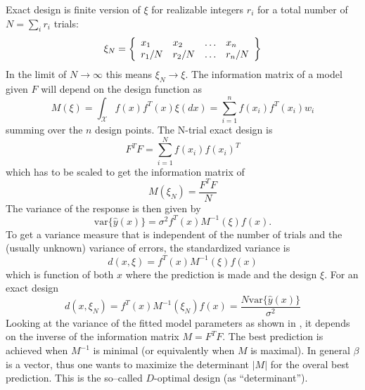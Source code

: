 \documentclass[12pt]{iopart}
\begin{document}
Exact design is finite version of $\xi$ for realizable integers $r_i$ for a total number of $N = \sum_i r_i$ trials:
\begin{equation}
\xi_N = \left\{
  \begin{array}{l l l l}
    x_1 & x_2 & \ldots & x_n\\
    r_1/N & r_2/N & \ldots & r_n/N\\
  \end{array} \right \}
\label{eq:xiexact}
\end{equation}
In the limit of $N \rightarrow \infty$ this means $\xi_N \rightarrow \xi$.
The information matrix of a model given $F$ will depend on the design function as
\begin{equation}
M(\xi) = \int_{\mathcal{X}} f(x)f^T(x) \xi(dx) = \sum_{i=1}^n f(x_i)f^T(x_i)w_i
\label{eq:infcont}
\end{equation}
summing over the $n$ design points.
The N-trial exact design is
\begin{equation}
F^T F = \sum_{i=1}^N f(x_i) f(x_i)^T
\end{equation}
which has to be scaled to get the information matrix of
\begin{equation}
M(\xi_N) = \frac{F^T F}{N}
\end{equation}
The variance of the response is then given by
\begin{equation}
\mathrm{var}\{\hat y(x)\} = \sigma^2 f^T(x) M^{-1}(\xi) f(x).
\end{equation}
To get a variance measure that is independent of the number of trials and the (usually unknown) variance of errors, the standardized variance is
\begin{equation}
d(x, \xi) = f^T(x) M^{-1}(\xi) f(x)
\label{eq:stdvar}
\end{equation}
which is function of both $x$ where the prediction is made and the design $\xi$.
For an exact design
\begin{equation}
d(x, \xi_N) = f^T(x) M^{-1}(\xi_N) f(x) = \frac{N \mathrm{var}\{\hat y(x)\}}{\sigma^2}
\end{equation}
Looking at the variance of the fitted model parameters as shown in , it depends on the inverse of the information matrix $M = F^TF$. The best prediction is achieved when $M^{-1}$ is minimal (or equivalently when $M$ is maximal). In general $\beta$ is a vector, thus one wants to maximize the determinant $|M|$ for the overal best prediction. This is the so--called $D$-optimal design (as ``determinant'').
\end{document}
